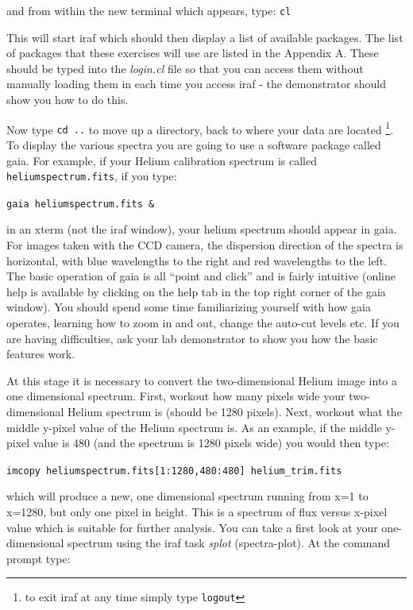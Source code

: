 \documentclass[12pt]{article}
\begin{document}
\noindent
and from within the new terminal which appears, type: {\tt cl}

\noindent
This will start {\sc iraf} which should then display a list of available
packages. The list of packages that these exercises will use are listed in the Appendix A. These should be typed into the {\it login.cl} file so that you can access them without manually loading them in each time you access {\sc iraf} - the demonstrator should show you how to do this.

Now type {\tt cd ..} to move up a directory, back to where
your data are located \footnote{to exit {\sc iraf} at any time simply type {\tt logout}}. To display the various spectra you are going to use a software package called {\sc gaia}. For example, if your Helium calibration spectrum is
called {\tt heliumspectrum.fits}, if you type:

{\tt gaia heliumspectrum.fits \&}

in an xterm (not the {\sc iraf} window), your helium spectrum should appear in {\sc gaia}. For images taken with the CCD camera, the 
dispersion direction of the spectra is horizontal, with blue
wavelengths to the right and red wavelengths to the left. The basic
operation of {\sc gaia} is all ``point and
click'' and is fairly intuitive (online help is available by
clicking on the {\sc help} tab in the top right corner of the {\sc
gaia} window). You should spend some time familiarizing yourself with
how {\sc gaia} operates, learning how to zoom in and out, change the
auto-cut levels etc. If you are having difficulties, ask your lab
demonstrator to show you how the basic features work.

At this stage it is necessary to convert the two-dimensional Helium
image into a one dimensional spectrum. First, workout how many pixels
wide your two-dimensional Helium spectrum is (should be 1280 pixels). Next, workout what
the middle y-pixel value of the Helium spectrum is. As an example, if
the middle y-pixel value is 480 (and the spectrum is 1280 pixels wide) you would then type:

{\tt imcopy heliumspectrum.fits[1:1280,480:480] helium\verb,_,trim.fits}

which will produce a new, one dimensional spectrum running from x=1
to x=1280, but only one pixel in height. This is a spectrum of flux versus
x-pixel value which is suitable for further analysis. You can take a
first look at your one-dimensional spectrum using the {\sc iraf} task 
{\it splot} (spectra-plot). At the command prompt type:
\end{document}
